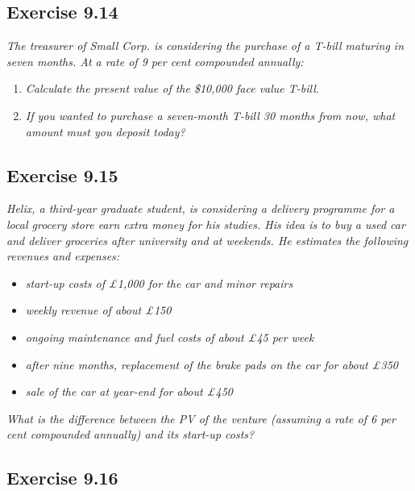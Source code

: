 \documentclass[]{book}
\theoremstyle{definition}
\theoremstyle{definition}
\theoremstyle{remark}
\begin{document}
\subsection{Exercise 9.14}\label{exercise-9.14}

\emph{The treasurer of Small Corp. is considering the purchase of a
T-bill maturing in seven months. At a rate of 9 per cent compounded
annually:} \citep[p.308]{book}

\begin{enumerate}
\def\labelenumi{\alph{enumi}.}
\item
  \emph{Calculate the present value of the \$10,000 face value T-bill.}
  \citep[p.308]{book}
\item
  \emph{If you wanted to purchase a seven-month T-bill 30 months from
  now, what amount must you deposit today?} \citep[p.308]{book}
\end{enumerate}

\subsection{Exercise 9.15}\label{exercise-9.15}

\emph{Helix, a third-year graduate student, is considering a delivery
programme for a local grocery store earn extra money for his studies.
His idea is to buy a used car and deliver groceries after university and
at weekends. He estimates the following revenues and expenses:}
\citep[p.308]{book}

\begin{itemize}
\item
  \emph{start-up costs of £1,000 for the car and minor repairs}
  \citep[p.308]{book}
\item
  \emph{weekly revenue of about £150} \citep[p.308]{book}
\item
  \emph{ongoing maintenance and fuel costs of about £45 per week}
  \citep[p.308]{book}
\item
  \emph{after nine months, replacement of the brake pads on the car for
  about £350} \citep[p.308]{book}
\item
  \emph{sale of the car at year-end for about £450} \citep[p.308]{book}
\end{itemize}

\emph{What is the difference between the PV of the venture (assuming a
rate of 6 per cent compounded annually) and its start-up costs?}
\citep[p.308]{book}

\subsection{Exercise 9.16}\label{exercise-9.16}
\end{document}

